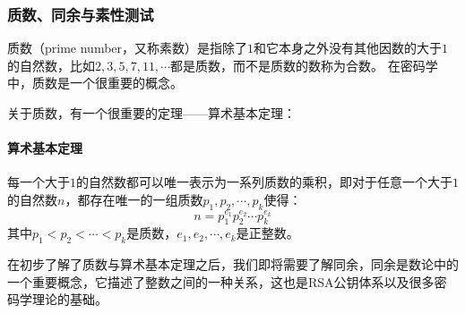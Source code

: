 \documentclass{article}
\numberwithin{equation}{subsubsection}
\begin{document}
\subsubsection{质数、同余与素性测试}
质数（prime number，又称素数）是指除了$1$和它本身之外没有其他因数的大于$1$的自然数，比如$2,3,5,7,11,\cdots$都是质数，而不是质数的数称为合数。
在密码学中，质数是一个很重要的概念。\par
关于质数，有一个很重要的定理——算术基本定理：
\paragraph{\textbf{算术基本定理}}
每一个大于$1$的自然数都可以唯一表示为一系列质数的乘积，即对于任意一个大于$1$的自然数$n$，都存在唯一的一组质数$p_1,p_2,\cdots,p_k$使得：
\begin{equation}
    n=p_1^{e_1}p_2^{e_2}\cdots p_k^{e_k}
    \nonumber
\end{equation}
其中$p_1<p_2<\cdots<p_k$是质数，$e_1,e_2,\cdots,e_k$是正整数。\par
在初步了解了质数与算术基本定理之后，我们即将需要了解同余，同余是数论中的一个重要概念，它描述了整数之间的一种关系，这也是RSA公钥体系以及很多密码学理论的基础。\par
\end{document}
